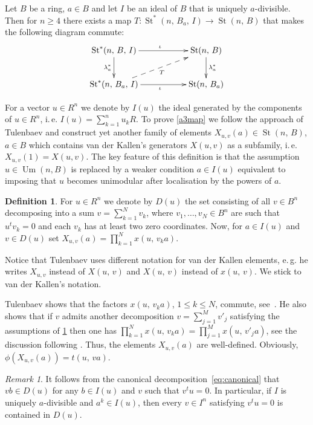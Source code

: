 \documentclass[11pt]{amsart}
\theoremstyle{plain} \declaretheorem[name=Theorem, Refname={Theorem,Theorems}]{tm} \Crefname{tm}{Theorem}{Theorems}
\numberwithin{equation}{section}
\theoremstyle{definition} \newtheorem{df}[lm]{Definition} \Crefname{df}{Definition}{Definitions}
\theoremstyle{remark} \newtheorem{rk}[lm]{Remark} \Crefname{rk}{Remark}{Remarks}
\newcommand{\Um}{\mathop{\mathrm{Um}}\nolimits}
\newcommand{\St}{\mathop{\mathrm{St}}\nolimits}
\begin{document}
\begin{tm} \label{a3map} Let $B$ be a ring, $a\in B$ and let $I$ be an ideal of $B$ that is uniquely $a$-divisible.
Then for $n\geq 4$ there exists a map $T\colon\St^*(n,\,B_a,\,I)\rightarrow\St(n,\,B)$ that makes the following diagram commute:
\begin{equation} \xymatrix{ \St^*(n,\,B,\,I)\ar@<-0.0ex>[rr]^{\iota}\ar@<-0.0ex>[d]_{\lambda_{a}^*} && \St(n,\,B)\ar@<-0.0ex>[d]^{\lambda_{a}^*}\\
                            \St^*(n,\,B_a,\,I)\ar@<-0.0ex>[rr]_{\iota}\ar@{-->}[rru]_{T}            && \St(n,\,B_a)} \label{eq:a3diag} \end{equation} \end{tm}

For a vector $u\in R^n$ we denote by $I(u)$ the ideal generated by the components of $u\in R^n$, i.\,e. $I(u)=\sum\limits_{k=1}^nu_kR$.
To prove \cref{a3map} we follow the approach of Tulenbaev and construct yet another family of elements $X_{u,v}(a)\in \St(n,\,B)$, $a\in B$ which contains van der Kallen's generators $X(u, v)$ as a subfamily, i.\,e. $X_{u,v}(1) = X(u, v)$.
The key feature of this definition is that the assumption $u \in\Um(n, B)$ is replaced by a weaker condition $a \in I(u)$ equivalent to imposing that $u$ becomes unimodular after localisation by the powers of $a$.

\setcounter{df}{1}
\begin{df} \label{df:TulX}
For $u \in R^n$ we denote by $D(u)$ the set consisting of all $v\in B^n$ decomposing into a sum $v=\sum_{k=1}^Nv_k$, where $v_1,\ldots,v_N\in B^n$ are such that $u^tv_k=0$ and each $v_k$ has at least two zero coordinates.
Now, for $a\in I(u)$ and $v \in D(u)$ set $X_{u,v}(a) = \prod\limits_{k=1}^Nx(u,\,v_ka)$.
\end{df}
Notice that Tulenbaev uses different notation for van der Kallen elements, e.\,g. he writes $X_{u,v}$ instead of $X(u,\,v)$ and $X(u,\,v)$ instead of $x(u,\,v)$. 
We stick to van der Kallen's notation.

Tulenbaev shows that the factors $x(u,\,v_ka)$, $1\leq k\leq N$, commute, see~\cite[Lemma~1.1\,e)]{Tul}.
He also shows that if $v$ admits another decomposition $v=\sum_{j=1}^Mv'_j$ satisfying the assumptions of \cref{df:TulX} then one has
$\prod_{k=1}^Nx(u,\,v_ka)=\prod_{j=1}^Mx(u,\,v'_ja)$, see the discussion following \cite[Lemma~1.1]{Tul}.
Thus, the elements $X_{u,v}(a)$ are well-defined. Obviously, $\phi(X_{u,v}(a))=t(u,\,va)$.

\begin{rk} \label{rk:ID}
It follows from the canonical decomposition~\eqref{eq:canonical} that $vb\in D(u)$ for any $b\in I(u)$ and $v$ such that $v^tu=0$.
In particular, if $I$ is uniquely $a$-divisible and $a^k\in I(u)$, then every $v\in I^n$ satisfying $v^tu=0$ is contained in $D(u)$.
\end{rk}
\end{document}
